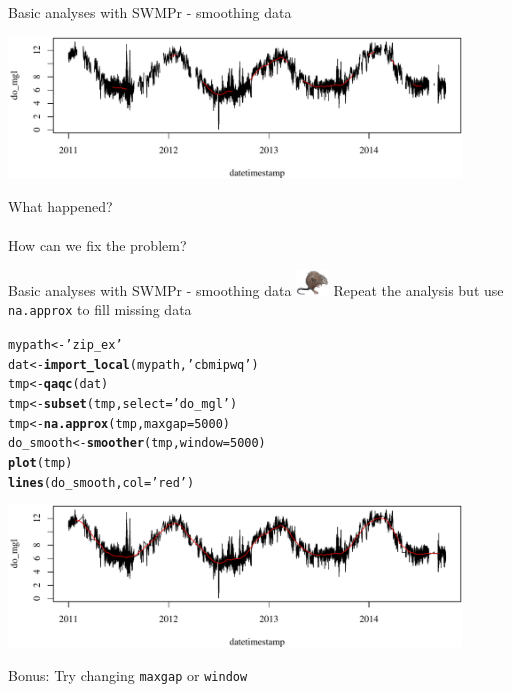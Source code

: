 \documentclass[xcolor=dvipsnames]{beamer}\usepackage[]{graphicx}\usepackage[]{color}
\makeatletter
\newcommand{\hlnum}[1]{\textcolor[rgb]{0.686,0.059,0.569}{#1}}%
\newcommand{\hlstr}[1]{\textcolor[rgb]{0.192,0.494,0.8}{#1}}%
\newcommand{\hlstd}[1]{\textcolor[rgb]{0.345,0.345,0.345}{#1}}%
\newcommand{\hlkwb}[1]{\textcolor[rgb]{0.69,0.353,0.396}{#1}}%
\newcommand{\hlkwc}[1]{\textcolor[rgb]{0.333,0.667,0.333}{#1}}%
\newcommand{\hlkwd}[1]{\textcolor[rgb]{0.737,0.353,0.396}{\textbf{#1}}}%
\newenvironment{kframe}{%
 \def\at@end@of@kframe{}%
 \ifinner\ifhmode%
  \def\at@end@of@kframe{\end{minipage}}%
  \begin{minipage}{\columnwidth}%
 \fi\fi%
 \def\FrameCommand##1{\hskip\@totalleftmargin \hskip-\fboxsep
 \colorbox{shadecolor}{##1}\hskip-\fboxsep
     \hskip-\linewidth \hskip-\@totalleftmargin \hskip\columnwidth}%
 \MakeFramed {\advance\hsize-\width
   \@totalleftmargin\z@ \linewidth\hsize
   \@setminipage}}%
 {\par\unskip\endMakeFramed%
 \at@end@of@kframe}
\newenvironment{knitrout}{}{} %
\makeatother
\begin{document}
\begin{frame}[fragile]{Basic analyses with SWMPr - smoothing data}
\begin{knitrout}\scriptsize
{}\color{fgcolor}

{\centering \includegraphics[width=0.9\textwidth]{figure/unnamed-chunk-16-1} 

}



\end{knitrout}
What happened?  \\~\\
How can we fix the problem? 
\end{frame}

\begin{frame}[fragile,t]{Basic analyses with SWMPr - smoothing data \includegraphics[width = 0.065\textwidth]{imgs/swmprat.png}}
\onslide<+->
Repeat the analysis but use \texttt{na.approx} to fill missing data
\begin{knitrout}\scriptsize
{}\color{fgcolor}\begin{kframe}
\begin{alltt}
\hlstd{mypath} \hlkwb{<-} \hlstr{'zip_ex'}
\hlstd{dat} \hlkwb{<-} \hlkwd{import_local}\hlstd{(mypath,} \hlstr{'cbmipwq'}\hlstd{)}
\hlstd{tmp} \hlkwb{<-} \hlkwd{qaqc}\hlstd{(dat)}
\hlstd{tmp} \hlkwb{<-} \hlkwd{subset}\hlstd{(tmp,} \hlkwc{select} \hlstd{=} \hlstr{'do_mgl'}\hlstd{)}
\hlstd{tmp} \hlkwb{<-} \hlkwd{na.approx}\hlstd{(tmp,} \hlkwc{maxgap} \hlstd{=} \hlnum{5000}\hlstd{)}
\hlstd{do_smooth} \hlkwb{<-} \hlkwd{smoother}\hlstd{(tmp,} \hlkwc{window} \hlstd{=} \hlnum{5000}\hlstd{)}
\hlkwd{plot}\hlstd{(tmp)}
\hlkwd{lines}\hlstd{(do_smooth,} \hlkwc{col} \hlstd{=} \hlstr{'red'}\hlstd{)}
\end{alltt}
\end{kframe}

{\centering \includegraphics[width=0.9\textwidth]{figure/unnamed-chunk-17-1} 

}



\end{knitrout}
\onslide<+->
Bonus: Try changing \texttt{maxgap} or \texttt{window}
\end{frame}
\end{document}
